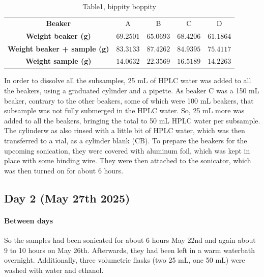 \documentclass[twocolumn,a4paper,aps,amsmath,amssymb,floatfix,superscriptaddress]{revtex4-2}
\begin{document}
	\begin{table}
		\centering
		\begin{threeparttable}
			\caption[table]{Table1, bippity boppity}
			\label{tab:Table1}
			\begin{tabular}{c||c|c|c|c}
				\textbf{Beaker} & A & B & C & D \\
				\hhline{=====}
				\textbf{Weight beaker (g)} & $69.2501$ & $65.0693$ & $68.4206$ & $61.1864$ \\
				\hline
				\textbf{Weight beaker + sample (g)} & $83.3133$ & $87.4262$ & $84.9395$ & $75.4117$ \\
				\hline
				\textbf{Weight sample (g)} & $14.0632$ & $22.3569$ & $16.5189$ & $14.2263$ \\
			\end{tabular}
		\end{threeparttable}
	\end{table}
	
	In order to dissolve all the subsamples, 25 mL of HPLC water was added to all the beakers, using a graduated cylinder and a pipette. As beaker C was a 150 mL beaker, contrary to the other beakers, some of which were 100 mL beakers, that subsample was not fully submerged in the HPLC water. So, 25 mL more was added to all the beakers, bringing the total to 50 mL HPLC water per subsample. \\ The cylinderw as also rinsed with a little bit of HPLC water, which was then transferred to a vial, as a cylinder blank (CB).
	To prepare the beakers for the upcoming sonication, they were covered with aluminum foil, which was kept in place with some binding wire. They were then attached to the sonicator, which was then turned on for about 6 hours.
	
	\subsection{Day 2 (May 27th 2025)}
	\paragraph{Between days}
	So the samples had been sonicated for about 6 hours May 22nd and again about 9 to 10 hours on May 26th. Afterwards, they had been left in a warm waterbath overnight. Additionally, three volumetric flasks (two 25 mL, one 50 mL) were washed with water and ethanol. 
\end{document}
